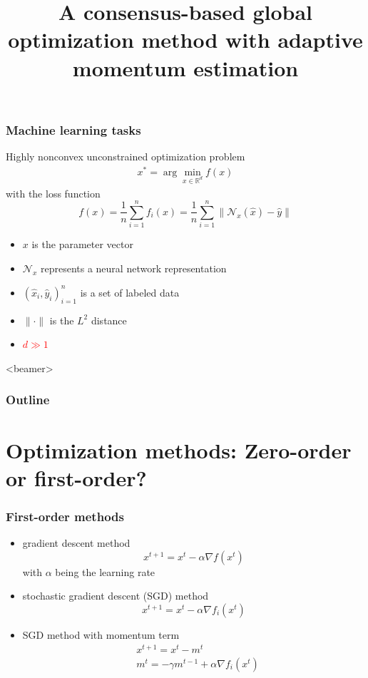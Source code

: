 \documentclass{beamer}
\begin{document}
	

\title[Adam-CBO]{A consensus-based global optimization method with adaptive momentum estimation}
\frame{\titlepage}


\begin{frame}
\frametitle{Machine learning tasks}

Highly nonconvex unconstrained optimization problem
\begin{align*}
x^* = \arg\min_{x\in \mathbb{R}^d} f(x)
\end{align*}
with the loss function
\begin{equation*}
f(x) = \frac{1}{n}\sum_{i=1}^n f_i(x) = \frac{1}{n}\sum_{i=1}^n\|\mathcal{N}_x(\hat{x})-\hat{y}\|
\end{equation*}
\begin{itemize}
	\item[] $x$ is the parameter vector
	\item[] $\mathcal{N}_x$ represents a neural network representation
	\item[] $(\hat{x}_i,\hat{y}_i)_{i=1}^n$ is a set of labeled data
	\item[] $\|\cdot\|$ is the $L^2$ distance
	\item[] \textcolor{red}{$d\gg 1$}
\end{itemize}

\end{frame}

\begin{frame}<beamer>
\frametitle{\textbf{Outline}}
\tableofcontents[]
\end{frame}

\section{Optimization methods: Zero-order or first-order?}

\begin{frame}
\frametitle{First-order methods}

\begin{itemize}
	\item gradient descent method
	\begin{equation*}
	x^{t+1} = x^t - \alpha \nabla f(x^t)
	\end{equation*}	
	with $\alpha$ being the learning rate
	\item stochastic gradient descent (SGD) method
	\begin{equation*}
		x^{t+1} = x^t - \alpha \nabla f_i(x^t)
	\end{equation*}	
	\item SGD method with momentum term 
	\begin{align*}
		&x^{t+1} = x^t - m^t\\
		&m^t = -\gamma m^{t-1} + \alpha \nabla f_i(x^t)
	\end{align*}
\end{itemize}

\end{frame}
\end{document}
